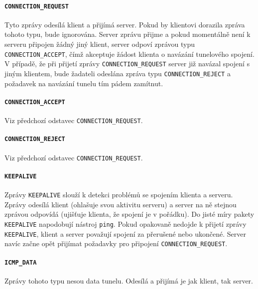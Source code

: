\documentclass[thesis=M,czech]{FITthesis}[2012/10/20]
\begin{document}
  \paragraph{\texttt{CONNECTION\_REQUEST}}
  
    Tyto zprávy odesílá klient a přijímá server. Pokud by klientovi dorazila zpráva tohoto typu, bude ignorována. Server zprávu přijme a pokud momentálně není k serveru připojen žádný jiný klient, server odpoví zprávou typu \texttt{CONNECTION\_ACCEPT}, čímž akceptuje žádost klienta o navázání tunelového spojení. V případě, že při přijetí zprávy \texttt{CONNECTION\_REQUEST} server již navázal spojení s jiným klientem, bude žadateli odeslána zpráva typu \texttt{CONNECTION\_REJECT} a požadavek na navázání tunelu tím pádem zamítnut.
    
  \paragraph{\texttt{CONNECTION\_ACCEPT}}
  
    Viz předchozí odstavec \texttt{CONNECTION\_REQUEST}.
    
  \paragraph{\texttt{CONNECTION\_REJECT}}
  
    Viz předchozí odstavec \texttt{CONNECTION\_REQUEST}.
    
  \paragraph{\texttt{KEEPALIVE}}
  
  Zprávy \texttt{KEEPALIVE} slouží k detekci problémů se spojením klienta a serveru. Zprávy odesílá klient (ohlašuje svou aktivitu serveru) a server na ně stejnou zprávou odpovídá (ujišťuje klienta, že spojení je v pořádku). Do jisté míry pakety \texttt{KEEPALIVE} napodobují nástroj \texttt{ping}. Pokud opakovaně nedojde k přijetí zprávy \texttt{KEEPALIVE}, klient a server považují spojení za přerušené nebo ukončené. Server navíc začne opět přijímat požadavky pro připojení \texttt{CONNECTION\_REQUEST}.
  
  \paragraph{\texttt{ICMP\_DATA}}
  
    Zprávy tohoto typu nesou data tunelu. Odesílá a přijímá je jak klient, tak server.
    
\end{document}
